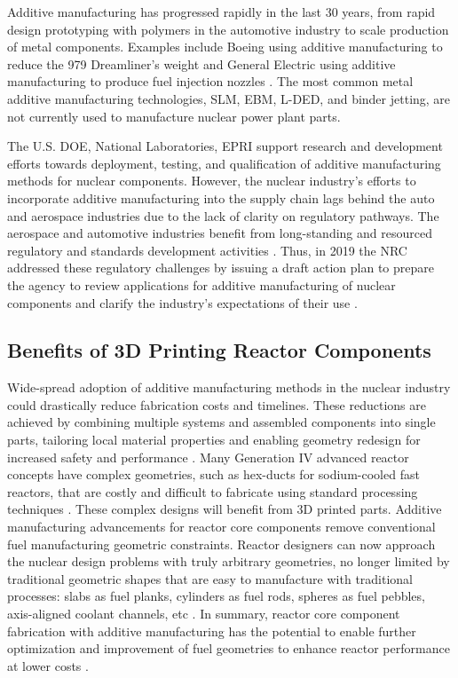 Additive manufacturing has progressed rapidly in the last 30 years, from rapid 
design prototyping with polymers in the automotive industry to scale production 
of metal components.  
Examples include Boeing using additive manufacturing to reduce the 979 
Dreamliner's weight \cite{noauthor_printed_2017} and General Electric using 
additive manufacturing to produce fuel injection nozzles 
\cite{noauthor_transformation_2018}. 
The most common metal additive manufacturing technologies, \gls{SLM}, \gls{EBM}, 
\gls{L-DED}, and binder jetting, are not currently used to manufacture nuclear 
power plant parts. 

The U.S. \gls{DOE}, National Laboratories, \gls{EPRI} support research and 
development efforts towards deployment, testing, and qualification 
of additive manufacturing methods for nuclear components. 
However, the nuclear industry's efforts to incorporate additive manufacturing 
into the supply chain lags behind the auto and aerospace industries due to the 
lack of clarity on regulatory pathways. 
The aerospace and automotive industries benefit from long-standing and resourced 
regulatory and standards development activities \cite{noauthor_roadmap_nodate}. 
Thus, in 2019 the \gls{NRC} addressed these regulatory challenges by issuing 
a draft action plan to prepare the agency to review applications for 
additive manufacturing of nuclear components and clarify the industry's 
expectations of their use \cite{noauthor_roadmap_nodate}.

\subsection{Benefits of 3D Printing Reactor Components}
\label{sec:am}
Wide-spread adoption of additive manufacturing methods in the nuclear industry 
could drastically reduce fabrication costs and timelines.
These reductions are achieved by combining multiple systems and assembled 
components into single parts, tailoring local material properties and enabling 
geometry redesign for increased safety and performance 
\cite{simpson_considerations_2019}. 
Many Generation IV advanced reactor concepts have complex geometries, 
such as hex-ducts for sodium-cooled fast reactors, that are costly and difficult 
to fabricate using standard processing techniques \cite{sridharan_performance_2019}.  
These complex designs will benefit from 3D printed parts. 
Additive manufacturing advancements for reactor core components remove
conventional fuel manufacturing geometric constraints.
Reactor designers can now approach the nuclear design problems with truly 
arbitrary geometries, no longer limited by traditional geometric shapes that are 
easy to manufacture with traditional processes: slabs as fuel planks, cylinders 
as fuel rods, spheres as fuel pebbles, axis-aligned coolant channels, etc 
\cite{sobes_artificial_2020}.
In summary, reactor core component fabrication with additive manufacturing 
has the potential to enable further optimization and improvement of fuel 
geometries to enhance reactor performance at lower costs \cite{bergeron_early_2018}. 

